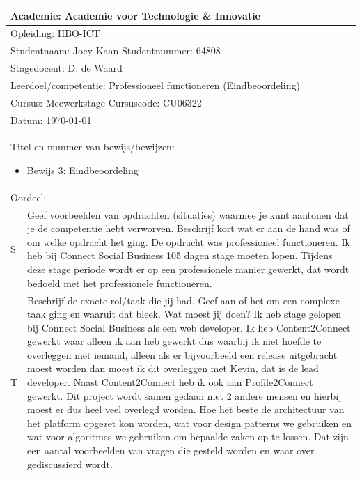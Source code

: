 \begin{tabularx}{\textwidth}{| l | X |}
\hline
\multicolumn{2}{|l|}{Academie: Academie voor Technologie \& Innovatie } \\
\hline
\multicolumn{2}{|l|}{Opleiding: HBO-ICT } \\
\hline
\multicolumn{2}{|l|}{Studentnaam: Joey Kaan \hspace{35pt} Studentnummer: 64808} \\
\hline
\multicolumn{2}{|l|}{Stagedocent: D. de Waard} \\
\hline
\multicolumn{2}{|p{\textwidth-1in}|}{Leerdoel/competentie: Professioneel functioneren (Eindbeoordeling)} \\
\hline
\multicolumn{2}{|l|}{Cursus: Meewerkstage \hspace{35pt} Cursuscode: CU06322} \\
\hline
\multicolumn{2}{|l|}{Datum: \today} \\
\hline
\multicolumn{2}{|l|}{
\begin{minipage}{0.9\columnwidth}
Titel en nummer van bewijs/bewijzen:
\begin{itemize}
\item Bewijs 3: Eindbeoordeling
\end{itemize}
\end{minipage}
} \\ [50pt]
\hline
\multicolumn{2}{|l|}{Oordeel: } \\
\hline
S & Geef voorbeelden van opdrachten (situaties) waarmee je kunt aantonen dat je de competentie hebt verworven. Beschrijf kort wat er aan de hand was of om welke opdracht het ging.
\newline
\newline
De opdracht was professioneel functioneren. Ik heb bij Connect Social Business 105 dagen stage moeten lopen. Tijdens deze stage periode wordt er op een professionele manier gewerkt, dat wordt bedoeld met het professionele functioneren.
\\
\hline
T & Beschrijf de exacte rol/taak die jij had. Geef aan of het om een complexe taak ging en waaruit dat bleek. Wat moest jij doen?
\newline
\newline
Ik heb stage gelopen bij Connect Social Business als een web developer. Ik heb Content2Connect gewerkt waar alleen ik aan heb gewerkt dus waarbij ik niet hoefde te overleggen met iemand, alleen als er bijvoorbeeld een release uitgebracht moest worden dan moest ik dit overleggen met Kevin, dat is de lead developer. Naast Content2Connect heb ik ook aan Profile2Connect gewerkt. Dit project wordt samen gedaan met 2 andere mensen en hierbij moest er dus heel veel overlegd worden. Hoe het beste de architectuur van het platform opgezet kon worden, wat voor design patterns we gebruiken en wat voor algoritmes we gebruiken om bepaalde zaken op te lossen. Dat zijn een aantal voorbeelden van vragen die gesteld worden en waar over gediscussierd wordt.

\end{tabularx}
